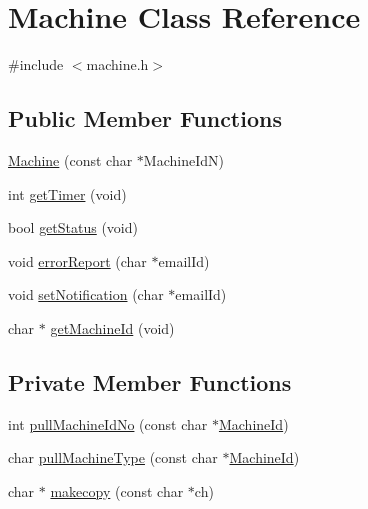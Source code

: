 \hypertarget{classMachine}{}\section{Machine Class Reference}
\label{classMachine}


{\ttfamily \#include $<$machine.\+h$>$}

\subsection*{Public Member Functions}
\begin{DoxyCompactItemize}
\item 
\hyperlink{classMachine_a76cfdcb722a27b8ac4c28d23b3e6212b}{Machine} (const char $\ast$Machine\+Id\+N)
\item 
int \hyperlink{classMachine_afafc49fd188ba582bdd6a0ecd714fb79}{get\+Timer} (void)
\item 
bool \hyperlink{classMachine_ab36b6edda2cbd7ae642d849eeda58a6e}{get\+Status} (void)
\item 
void \hyperlink{classMachine_a09f13c6c9a88ed77ef83ec8cfdafada3}{error\+Report} (char $\ast$email\+Id)
\item 
void \hyperlink{classMachine_aa5d8ae35383f5957bcad59226d4a44ed}{set\+Notification} (char $\ast$email\+Id)
\item 
char $\ast$ \hyperlink{classMachine_ae59177ed732c7ee3d80797310efba80d}{get\+Machine\+Id} (void)
\end{DoxyCompactItemize}
\subsection*{Private Member Functions}
\begin{DoxyCompactItemize}
\item 
int \hyperlink{classMachine_a87c0700309cbbba927df91207f29c91e}{pull\+Machine\+Id\+No} (const char $\ast$\hyperlink{classMachine_a3b65ac5d1d92eb6bb34302dea5e95260}{Machine\+Id})
\item 
char \hyperlink{classMachine_a47b70082f9d4417ae0d04b064eca7f11}{pull\+Machine\+Type} (const char $\ast$\hyperlink{classMachine_a3b65ac5d1d92eb6bb34302dea5e95260}{Machine\+Id})
\item 
char $\ast$ \hyperlink{classMachine_abb9fdde34f896ef4bd3eb7f77e3a999a}{makecopy} (const char $\ast$ch)
\end{DoxyCompactItemize}
